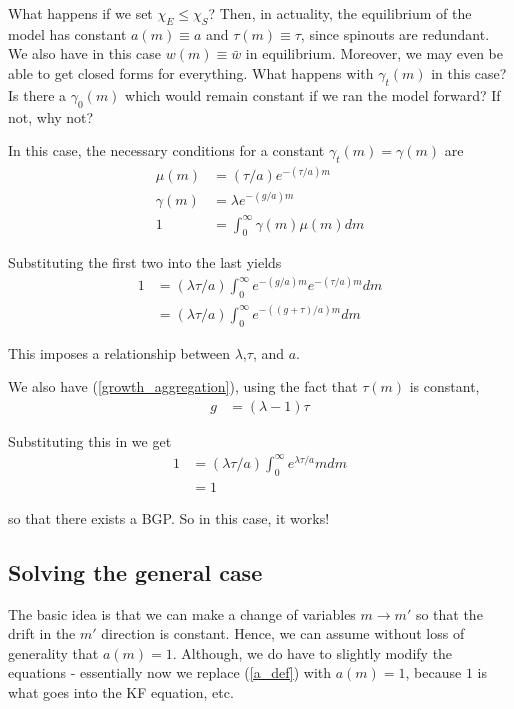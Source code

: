 \documentclass[12pt,english]{article}
\theoremstyle{remark}
\begin{document}
What happens if we set $\chi_E \le \chi_S$? Then, in actuality, the equilibrium of the model has constant $a(m) \equiv a$ and $\tau(m) \equiv \tau$, since spinouts are redundant. We also have in this case $w(m) \equiv \bar{w}$ in equilibrium. Moreover, we may even be able to get closed forms for everything. What happens with $\gamma_t(m)$ in this case? Is there a $\gamma_0(m)$ which would remain constant if we ran the model forward? If not, why not?

In this case, the necessary conditions for a constant $\gamma_t(m) = \gamma(m)$ are 
\begin{align*}
	\mu(m) &= (\tau / a) e^{-(\tau/a)m} \\
	\gamma(m) &= \lambda e^{-(g/a)m} \\
	1 &= \int_0^{\infty} \gamma(m) \mu(m) dm
\end{align*}

Substituting the first two into the last yields
\begin{align*}
	1 &= (\lambda \tau / a)  \int_0^{\infty} e^{-(g/a)m} e^{-(\tau/a)m} dm \\ 
	  &= (\lambda \tau / a)  \int_0^{\infty} e^{-((g + \tau)/a)m} dm
\end{align*}

This imposes a relationship between $\lambda$,$\tau$, and $a$.

We also have (\ref{growth_aggregation}), using the fact that $\tau(m)$ is constant, 
\begin{align*}
	g &= (\lambda-1) \tau 
\end{align*}

Substituting this in we get 
\begin{align*}
	1 &= (\lambda \tau / a) \int_0^{\infty} e^{\lambda \tau / a} m dm \\
	  &= 1
\end{align*}

so that there exists a BGP. So in this case, it works!

\subsection{Solving the general case}
The basic idea is that we can make a change of variables $m \to m'$ so that the drift in the $m'$ direction is constant. Hence, we can assume without loss of generality that $a(m) = 1$. Although, we do have to slightly modify the equations - essentially now we replace (\ref{a_def}) with $a(m) = 1$, because $1$ is what goes into the KF equation, etc. 
\end{document}
